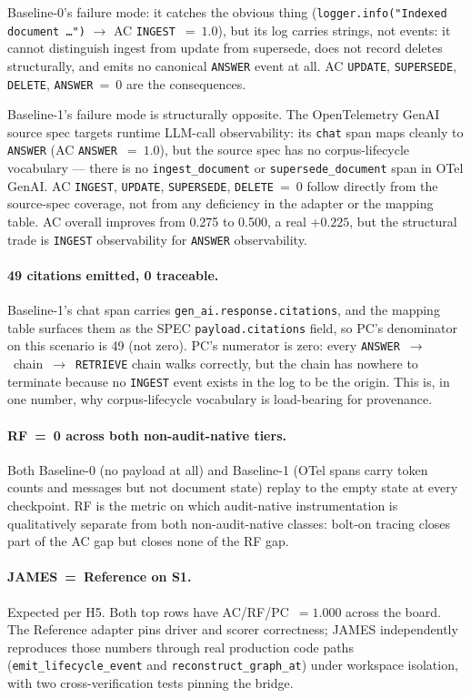 \documentclass[11pt,a4paper]{article}
\begin{document}
Baseline-0's failure mode: it catches the obvious thing (\texttt{logger.info("Indexed document …")} $\to$ AC \texttt{INGEST}~$=~1.0$), but its log carries strings, not events: it cannot distinguish ingest from update from supersede, does not record deletes structurally, and emits no canonical \texttt{ANSWER} event at all. AC \texttt{UPDATE}, \texttt{SUPERSEDE}, \texttt{DELETE}, \texttt{ANSWER}~=~0 are the consequences.

Baseline-1's failure mode is structurally opposite. The OpenTelemetry GenAI source spec targets runtime LLM-call observability: its \texttt{chat} span maps cleanly to \texttt{ANSWER} (AC \texttt{ANSWER}~$=~1.0$), but the source spec has no corpus-lifecycle vocabulary --- there is no \texttt{ingest\_document} or \texttt{supersede\_document} span in OTel GenAI. AC \texttt{INGEST}, \texttt{UPDATE}, \texttt{SUPERSEDE}, \texttt{DELETE}~=~0 follow directly from the source-spec coverage, not from any deficiency in the adapter or the mapping table. AC overall improves from 0.275 to 0.500, a real \(+0.225\), but the structural trade is \texttt{INGEST} observability for \texttt{ANSWER} observability.

\paragraph{49 citations emitted, 0 traceable.} Baseline-1's chat span carries \texttt{gen\_ai.response.citations}, and the mapping table surfaces them as the SPEC \texttt{payload.citations} field, so PC's denominator on this scenario is 49 (not zero). PC's numerator is zero: every \texttt{ANSWER}~$\to$~chain~$\to$~\texttt{RETRIEVE} chain walks correctly, but the chain has nowhere to terminate because no \texttt{INGEST} event exists in the log to be the origin. This is, in one number, why corpus-lifecycle vocabulary is load-bearing for provenance.

\paragraph{RF~=~0 across both non-audit-native tiers.} Both Baseline-0 (no payload at all) and Baseline-1 (OTel spans carry token counts and messages but not document state) replay to the empty state at every checkpoint. RF is the metric on which audit-native instrumentation is qualitatively separate from both non-audit-native classes: bolt-on tracing closes part of the AC gap but closes none of the RF gap.

\paragraph{JAMES~=~Reference on S1.} Expected per H5. Both top rows have AC/RF/PC~$=1.000$ across the board. The Reference adapter pins driver and scorer correctness; JAMES independently reproduces those numbers through real production code paths (\texttt{emit\_lifecycle\_event} and \texttt{reconstruct\_graph\_at}) under workspace isolation, with two cross-verification tests pinning the bridge.
\end{document}
